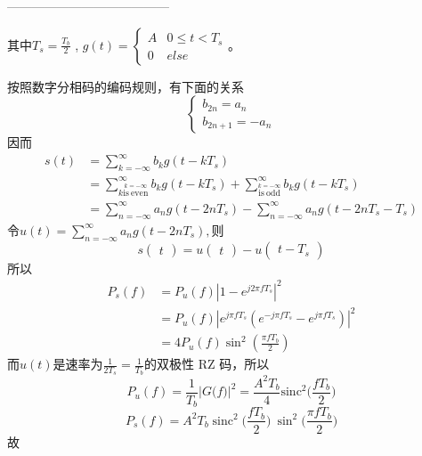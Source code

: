 \documentclass[utf8]{article}
\begin{document}
---------------------------------------

其中$T_s= \frac {T_{b}}2$ , $g\left ( t\right ) = \begin{cases} A& {0\leq t< T_{s}}\\ 0& {else} \end{cases}$。


按照数字分相码的编码规则，有下面的关系
$$\begin{cases}b_{2n}=a_n\\b_{2n+1}=-a_n\end{cases}$$
因而
$$\begin{aligned}s\left(t\right)&=\sum_{k=-\infty}^{\infty}b_{k}g\left(t-kT_{s}\right)\\&=\sum_{k\overset{k=-\infty}{\mathrm{is~even}}}^{\infty}b_{k}g\left(t-kT_{s}\right)+\sum_{\overset{k=-\infty}{\mathrm{is~odd}}}^{\infty}b_{k}g\left(t-kT_{s}\right)\\&=\sum_{n=-\infty}^{\infty}a_{n}g\left(t-2nT_{s}\right)-\sum_{n=-\infty}^{\infty}a_{n}g\left(t-2nT_{s}-T_{s}\right)\end{aligned}$$
$令u\left(t\right)=\sum_{n=-\infty}^{\infty}a_{n}g\left(t-2nT_{s}\right),则$
$$s\begin{pmatrix}t\end{pmatrix}=u\begin{pmatrix}t\end{pmatrix}-u\begin{pmatrix}t-T_s\end{pmatrix}$$
所以
$$\begin{aligned}P_{s}\left(f\right)&=P_{u}\left(f\right)\left|1-e^{j2\pi fT_{s}}\right|^{2}\\&=P_{u}\left(f\right)\left|e^{j\pi fT_{s}}\left(e^{-j\pi fT_{s}}-e^{j\pi fT_{s}}\right)\right|^{2}\\&=4P_{u}\left(f\right)\sin^{2}\left(\frac{\pi fT_{b}}{2}\right)\end{aligned}$$
而$u\left(t\right)$是速率为$\frac1{2T_{s}}=\frac1{T_{b}}$的双极性 RZ 码，所以
$$P_{u}\left(f\right)=\frac{1}{T_{b}}\Big|G\big(f\big)\Big|^{2}=\frac{A^{2}T_{b}}{4}\mathrm{sinc}^{2}\Bigg(\frac{fT_{b}}{2}\Bigg)$$
$$P_s\left(f\right)=A^2T_b\operatorname{sinc}^2\Bigg(\frac{fT_b}{2}\Bigg)\:\sin^2\Bigg(\frac{\pi fT_b}{2}\Bigg)$$
故
\end{document}
